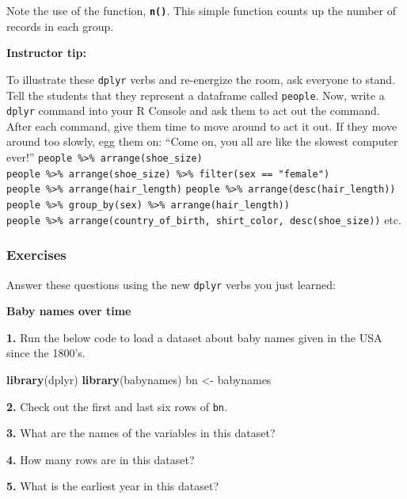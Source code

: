 \documentclass[]{book}
\newenvironment{Shaded}{\begin{snugshade}}{\end{snugshade}}
\newcommand{\KeywordTok}[1]{\textcolor[rgb]{0.13,0.29,0.53}{\textbf{#1}}}
\newcommand{\NormalTok}[1]{#1}
\newcommand{\StringTok}[1]{\textcolor[rgb]{0.31,0.60,0.02}{#1}}
\begin{document}
Note the use of the function, \textbf{\texttt{n()}}. This simple function counts up the number of records in each group.

\leavevmode\hypertarget{tip-text}{}%
\textbf{Instructor tip:}

To illustrate these \texttt{dplyr} verbs and re-energize the room, ask everyone to stand. Tell the students that they represent a dataframe called \texttt{people}. Now, write a \texttt{dplyr} command into your R Console and ask them to act out the command. After each command, give them time to move around to act it out. If they move around too slowly, egg them on: ``Come on, you all are like the slowest computer ever!'' \texttt{people\ \%\textgreater{}\%\ arrange(shoe\_size)} \texttt{people\ \%\textgreater{}\%\ arrange(shoe\_size)\ \%\textgreater{}\%\ filter(sex\ ==\ "female")} \texttt{people\ \%\textgreater{}\%\ arrange(hair\_length)} \texttt{people\ \%\textgreater{}\%\ arrange(desc(hair\_length))} \texttt{people\ \%\textgreater{}\%\ group\_by(sex)\ \%\textgreater{}\%\ arrange(hair\_length))} \texttt{people\ \%\textgreater{}\%\ arrange(country\_of\_birth,\ shirt\_color,\ desc(shoe\_size))} etc.

\hypertarget{exercises-9}{%
\subsubsection*{Exercises}\label{exercises-9}}

Answer these questions using the new \texttt{dplyr} verbs you just learned:

\textbf{Baby names over time}

\textbf{1.} Run the below code to load a dataset about baby names given in the USA since the 1800's.

\begin{Shaded}
\begin{Highlighting}[]
\KeywordTok{library}\NormalTok{(dplyr)}
\KeywordTok{library}\NormalTok{(babynames)}
\NormalTok{bn <-}\StringTok{ }\NormalTok{babynames}
\end{Highlighting}
\end{Shaded}

\textbf{2.} Check out the first and last six rows of \texttt{bn}.

\textbf{3.} What are the names of the variables in this dataset?

\textbf{4.} How many rows are in this dataset?

\textbf{5.} What is the earliest year in this dataset?
\end{document}
